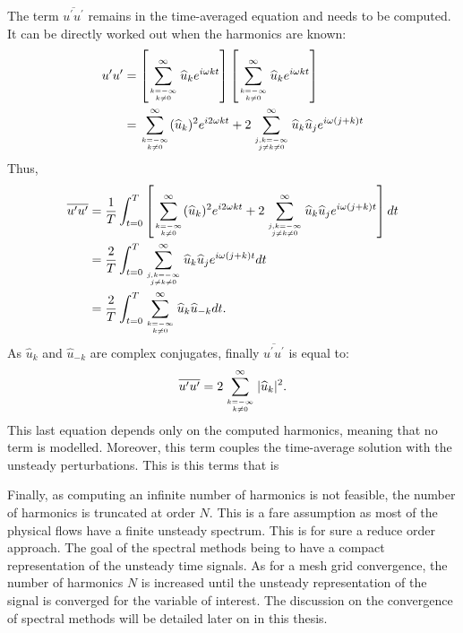 The term $\overline{u^\prime u^\prime}$ remains in the time-averaged
equation and needs to be computed. It can be 
directly worked out when the harmonics are known:
\begin{equation}
	\begin{split}
		u^\prime u^\prime &= 
		\left[
			\sum_{k=-\infty \atop k \neq 0}^{\infty} \widehat{u}_k e^{i \omega k t} 
		\right]
		\left[
			\sum_{k=-\infty \atop k \neq 0}^{\infty} \widehat{u}_k e^{i \omega k t} 
		\right] \\
		&= \sum_{k=-\infty \atop k \neq 0}^{\infty} (\widehat{u}_k)^2
		   e^{i 2 \omega k t} +
		   2 \sum_{j,k=-\infty \atop j \neq k \neq 0}^{\infty} 
		   \widehat{u}_k \widehat{u}_j e^{i \omega (j + k) t} \\
	\end{split}
\end{equation}
Thus,
\begin{equation}
	\begin{split}
		\overline{u^\prime u^\prime} &= 
		\frac{1}{T} \int_{t=0}^{T} \left[ 
			\sum_{k=-\infty \atop k \neq 0}^{\infty} (\widehat{u}_k)^2
		   	e^{i 2 \omega k t} +
		   	2 \sum_{j,k=-\infty \atop j \neq k \neq 0}^{\infty} 
		   	\widehat{u}_k \widehat{u}_j e^{i \omega (j + k) t} 
		\right] dt\\
		&= \frac{2}{T} \int_{t=0}^{T} \sum_{j,k=-\infty \atop j \neq k \neq 0}^{\infty} 
		   	\widehat{u}_k \widehat{u}_j 
		   	e^{i \omega (j + k) t} dt \\
		&= \frac{2}{T} \int_{t=0}^{T} 
			\sum_{k=-\infty \atop k \neq 0}^{\infty} 
			\widehat{u}_k \widehat{u}_{-k}  dt.
	\end{split}
\end{equation}
As $\widehat{u}_k$ and $\widehat{u}_{-k}$ are complex conjugates,
finally $\overline{u^\prime u^\prime}$ is equal to:
\begin{equation}
	\overline{u^\prime u^\prime} = 
	2 \sum_{k=-\infty \atop k \neq 0}^{\infty} |\widehat{u}_k|^2.
	\label{eq:sm_nlh_deterministic_stress_terms}
\end{equation}
This last equation depends only on the computed harmonics, meaning
that no term is modelled. Moreover, this term couples the
time-average solution with the unsteady perturbations. This is this
terms that is 

Finally, as computing an infinite number of harmonics is not feasible,
the number of harmonics is truncated at order $N$. 
This is a fare assumption as most
of the physical flows have a finite unsteady spectrum. This
is for sure a reduce order approach. The goal of the spectral
methods being to have a compact representation of the unsteady time
signals. As for a mesh grid convergence, the number of harmonics $N$
is increased until the unsteady representation of the signal is
converged for the variable of interest. The discussion on the
convergence of spectral methods will be detailed later on in this 
thesis.

